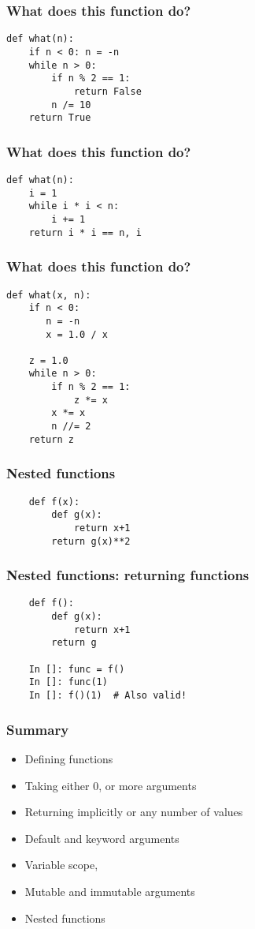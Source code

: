 \documentclass[14pt,compress]{beamer}
\begin{document}
\begin{frame}[fragile]
  \frametitle {What does this function do?}
  \begin{lstlisting}
def what(n):
    if n < 0: n = -n
    while n > 0:
        if n % 2 == 1:
            return False
        n /= 10
    return True
  \end{lstlisting}
\end{frame}

\begin{frame}[fragile]
  \frametitle{What does this function do?}
\begin{lstlisting}
def what(n):
    i = 1
    while i * i < n:
        i += 1
    return i * i == n, i
  \end{lstlisting}
\end{frame}

\begin{frame}[fragile]
  \frametitle {What does this function do?}
  \begin{lstlisting}
def what(x, n):
    if n < 0:
       n = -n
       x = 1.0 / x

    z = 1.0
    while n > 0:
        if n % 2 == 1:
            z *= x
        x *= x
        n //= 2
    return z
  \end{lstlisting}
\end{frame}

\begin{frame}[fragile]
  \frametitle{Nested functions}
  \begin{lstlisting}
    def f(x):
        def g(x):
            return x+1
        return g(x)**2
  \end{lstlisting}
\end{frame}

\begin{frame}[fragile]
  \frametitle{Nested functions: returning functions}
  \begin{lstlisting}
    def f():
        def g(x):
            return x+1
        return g

    In []: func = f()
    In []: func(1)
    In []: f()(1)  # Also valid!
  \end{lstlisting}
\end{frame}


\begin{frame}
  \frametitle{Summary}
  \begin{itemize}
  \item Defining functions
  \item Taking either 0, or more arguments
  \item Returning  implicitly or any number of values
  \item Default and keyword arguments
  \item Variable scope, 
  \item Mutable and immutable arguments
  \item Nested functions
  \end{itemize}
\end{frame}
\end{document}
